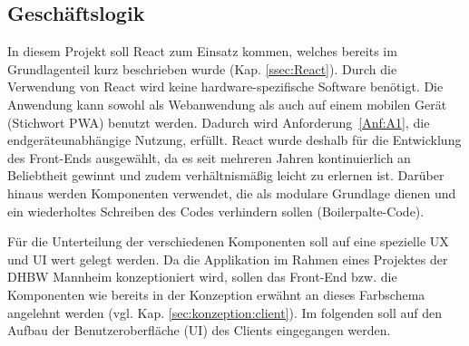 
\subsection{Geschäftslogik}
\label{ssec:GeschaeftslogikClient}

In diesem Projekt soll React zum Einsatz kommen, welches bereits im Grundlagenteil kurz beschrieben wurde (Kap. \vref{ssec:React}).
Durch die Verwendung von React wird keine hardware-spezifische Software benötigt.
Die Anwendung kann sowohl als Webanwendung als auch auf einem mobilen Gerät (Stichwort \ac{PWA}) benutzt werden.
Dadurch wird Anforderung~\ref{Anf:A1}, die endgeräteunabhängige Nutzung, erfüllt.
React wurde \ua deshalb für die Entwicklung des Front-Ends ausgewählt, da es seit mehreren Jahren kontinuierlich an Beliebtheit gewinnt\autocite[vgl.][]{stacoverflow_Top_Frameworks} und zudem verhältnismäßig leicht zu erlernen ist.
Darüber hinaus werden Komponenten verwendet, die als modulare Grundlage dienen und ein wiederholtes Schreiben des Codes verhindern sollen (Boilerpalte-Code).

Für die Unterteilung der verschiedenen Komponenten soll auf eine spezielle \ac{UX} und \ac{UI} wert gelegt werden.
Da die Applikation im Rahmen eines Projektes der DHBW Mannheim konzeptioniert wird, sollen das Front-End bzw. die Komponenten wie bereits in der Konzeption erwähnt an dieses Farbschema angelehnt werden (vgl. Kap. \vref{sec:konzeption:client}).
Im folgenden soll auf den Aufbau der Benutzeroberfläche (\ac{UI}) des Clients eingegangen werden.